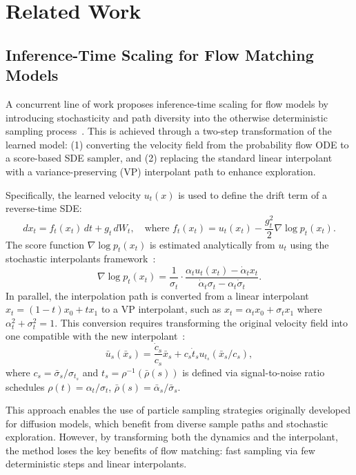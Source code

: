 \documentclass{article}
\begin{document}
\section{Related Work}
\label{sec:related}

\subsection{Inference-Time Scaling for Flow Matching Models}

A concurrent line of work proposes inference-time scaling for flow models by introducing stochasticity and path diversity into the otherwise deterministic sampling process~\cite{kim2025flowits}. This is achieved through a two-step transformation of the learned model: (1) converting the velocity field from the probability flow ODE to a score-based SDE sampler, and (2) replacing the standard linear interpolant with a variance-preserving (VP) interpolant path to enhance exploration.

Specifically, the learned velocity \( u_t(x) \) is used to define the drift term of a reverse-time SDE:
\[
d x_t = f_t(x_t)\,dt + g_t\,dW_t, \quad \text{where } f_t(x_t) = u_t(x_t) - \frac{g_t^2}{2} \nabla \log p_t(x_t).
\]
The score function \( \nabla \log p_t(x_t) \) is estimated analytically from \( u_t \) using the stochastic interpolants framework~\cite{ma2024sit}:
\[
\nabla \log p_t(x_t) = \frac{1}{\sigma_t} \cdot \frac{\alpha_t u_t(x_t) - \dot{\alpha}_t x_t}{\dot{\alpha}_t \sigma_t - \alpha_t \dot{\sigma}_t}.
\]
In parallel, the interpolation path is converted from a linear interpolant \( x_t = (1 - t)x_0 + t x_1 \) to a VP interpolant, such as \( x_t = \alpha_t x_0 + \sigma_t x_1 \) where \(\alpha_t^2 + \sigma_t^2 = 1\). This conversion requires transforming the original velocity field into one compatible with the new interpolant~\cite{kim2025flowits}:
\[
\bar{u}_s(\bar{x}_s) = \frac{\dot{c}_s}{c_s} \bar{x}_s + c_s \dot{t}_s u_{t_s}(\bar{x}_s / c_s),
\]
where \(c_s = \bar{\sigma}_s / \sigma_{t_s}\) and \(t_s = \rho^{-1}(\bar{\rho}(s))\) is defined via signal-to-noise ratio schedules \(\rho(t) = \alpha_t/\sigma_t\), \(\bar{\rho}(s) = \bar{\alpha}_s/\bar{\sigma}_s\).

This approach enables the use of particle sampling strategies originally developed for diffusion models, which benefit from diverse sample paths and stochastic exploration. However, by transforming both the dynamics and the interpolant, the method loses the key benefits of flow matching: fast sampling via few deterministic steps and linear interpolants.
\end{document}
